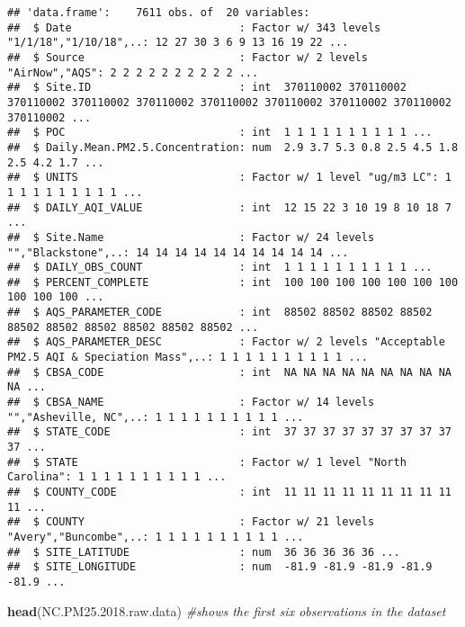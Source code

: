 \documentclass[]{article}
\newenvironment{Shaded}{\begin{snugshade}}{\end{snugshade}}
\newcommand{\KeywordTok}[1]{\textcolor[rgb]{0.13,0.29,0.53}{\textbf{#1}}}
\newcommand{\FloatTok}[1]{\textcolor[rgb]{0.00,0.00,0.81}{#1}}
\newcommand{\CommentTok}[1]{\textcolor[rgb]{0.56,0.35,0.01}{\textit{#1}}}
\newcommand{\NormalTok}[1]{#1}
\begin{document}
\begin{verbatim}
## 'data.frame':    7611 obs. of  20 variables:
##  $ Date                          : Factor w/ 343 levels "1/1/18","1/10/18",..: 12 27 30 3 6 9 13 16 19 22 ...
##  $ Source                        : Factor w/ 2 levels "AirNow","AQS": 2 2 2 2 2 2 2 2 2 2 ...
##  $ Site.ID                       : int  370110002 370110002 370110002 370110002 370110002 370110002 370110002 370110002 370110002 370110002 ...
##  $ POC                           : int  1 1 1 1 1 1 1 1 1 1 ...
##  $ Daily.Mean.PM2.5.Concentration: num  2.9 3.7 5.3 0.8 2.5 4.5 1.8 2.5 4.2 1.7 ...
##  $ UNITS                         : Factor w/ 1 level "ug/m3 LC": 1 1 1 1 1 1 1 1 1 1 ...
##  $ DAILY_AQI_VALUE               : int  12 15 22 3 10 19 8 10 18 7 ...
##  $ Site.Name                     : Factor w/ 24 levels "","Blackstone",..: 14 14 14 14 14 14 14 14 14 14 ...
##  $ DAILY_OBS_COUNT               : int  1 1 1 1 1 1 1 1 1 1 ...
##  $ PERCENT_COMPLETE              : int  100 100 100 100 100 100 100 100 100 100 ...
##  $ AQS_PARAMETER_CODE            : int  88502 88502 88502 88502 88502 88502 88502 88502 88502 88502 ...
##  $ AQS_PARAMETER_DESC            : Factor w/ 2 levels "Acceptable PM2.5 AQI & Speciation Mass",..: 1 1 1 1 1 1 1 1 1 1 ...
##  $ CBSA_CODE                     : int  NA NA NA NA NA NA NA NA NA NA ...
##  $ CBSA_NAME                     : Factor w/ 14 levels "","Asheville, NC",..: 1 1 1 1 1 1 1 1 1 1 ...
##  $ STATE_CODE                    : int  37 37 37 37 37 37 37 37 37 37 ...
##  $ STATE                         : Factor w/ 1 level "North Carolina": 1 1 1 1 1 1 1 1 1 1 ...
##  $ COUNTY_CODE                   : int  11 11 11 11 11 11 11 11 11 11 ...
##  $ COUNTY                        : Factor w/ 21 levels "Avery","Buncombe",..: 1 1 1 1 1 1 1 1 1 1 ...
##  $ SITE_LATITUDE                 : num  36 36 36 36 36 ...
##  $ SITE_LONGITUDE                : num  -81.9 -81.9 -81.9 -81.9 -81.9 ...
\end{verbatim}

\begin{Shaded}
\begin{Highlighting}[]
\KeywordTok{head}\NormalTok{(NC.PM25.}\FloatTok{2018.}\NormalTok{raw.data) }\CommentTok{#shows the first six observations in the dataset}
\end{Highlighting}
\end{Shaded}
\end{document}
